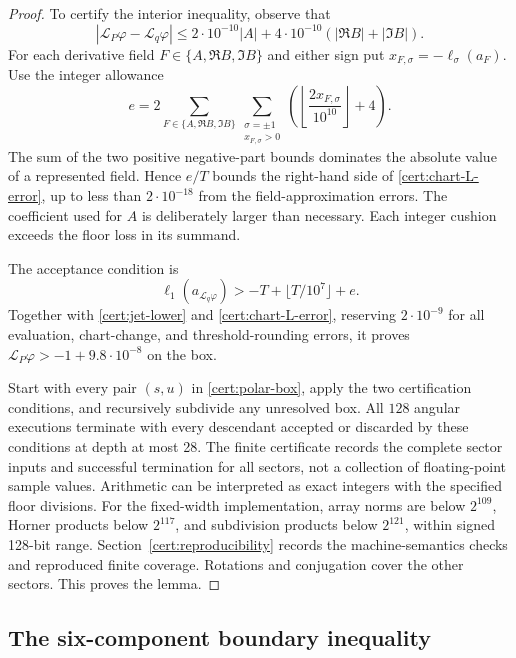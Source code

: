 \begin{proof}
To certify the interior inequality, observe that
\begin{equation}\label{cert:chart-L-error}
 |\mathcal L_P\varphi-\mathcal L_q\varphi|
 \leq2\cdot10^{-10}|A|
              +4\cdot10^{-10}(|\Re B|+|\Im B|).
\end{equation}
For each derivative field $F\in\{A,\Re B,\Im B\}$ and either sign put
$x_{F,\sigma}=-\ell_\sigma(a_F)$.  Use the integer allowance
\[
 e=2\sum_{F\in\{A,\Re B,\Im B\}}
           \sum_{\substack{\sigma=\pm1\\x_{F,\sigma}>0}}
             \left(\left\lfloor\frac{2x_{F,\sigma}}{10^{10}}\right\rfloor+4\right).
\]
The sum of the two positive negative-part bounds dominates the absolute
value of a represented field.  Hence $e/T$ bounds the right-hand side of
\eqref{cert:chart-L-error}, up to less than $2\cdot10^{-18}$ from the
field-approximation errors.  The coefficient used for $A$ is deliberately
larger than necessary.  Each integer cushion exceeds the floor loss in its
summand.

The acceptance condition is
\begin{equation}\label{cert:accept-test}
 \ell_1(a_{\mathcal L_q\varphi})>-T+\lfloor T/10^7\rfloor+e.
\end{equation}
Together with \eqref{cert:jet-lower} and \eqref{cert:chart-L-error}, reserving
$2\cdot10^{-9}$ for all evaluation, chart-change, and threshold-rounding
errors, it proves
$\mathcal L_P\varphi>-1+9.8\cdot10^{-8}$ on the box.

Start with every pair $(s,u)$ in \eqref{cert:polar-box}, apply the two
certification conditions, and recursively subdivide any unresolved box.
All $128$ angular executions terminate with every descendant accepted or
discarded by these conditions at depth at most 28.  The finite certificate
records the complete sector inputs and successful termination for all
sectors, not a collection of floating-point sample values.  Arithmetic can
be interpreted as exact integers with the specified floor divisions.
For the fixed-width implementation, array norms are below $2^{109}$,
Horner products below $2^{117}$, and subdivision products below $2^{121}$,
within signed 128-bit range.  Section~\ref{cert:reproducibility} records the
machine-semantics checks and reproduced finite coverage.  Rotations and
conjugation cover the other sectors.  This proves the lemma.
\end{proof}

\subsection{The six-component boundary inequality}
\label{cert:boundary}

